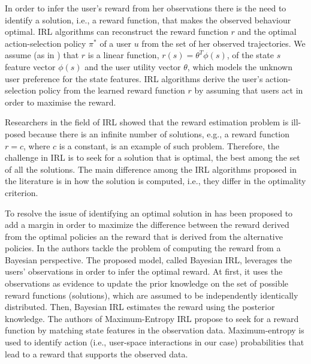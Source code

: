 In order to infer the user's reward from her observations there is the need to identify a solution, i.e., a reward function, that makes the observed behaviour optimal. 
IRL algorithms can reconstruct the reward function $r$ and the optimal action-selection policy $\pi^*$ of a user $u$ from the set of her observed trajectories. We assume (as in \cite{ng:2000}) that $r$ is a linear function, $r(s) = \theta^T\phi(s)$, of the state $s$ feature vector $\phi(s)$ 
and the user utility vector $\theta$, which models the unknown user preference for the state features. IRL algorithms derive the user's action-selection policy from the learned reward function $r$ by assuming that users act in order to maximise the reward.

Researchers in the field of IRL showed that the reward estimation problem is ill-posed because there is an infinite number of solutions, e.g., a reward function $r=c$, where $c$ is a constant, is an example of such problem.
Therefore, the challenge in IRL is to seek for a solution that is optimal, the best among the set of all the solutions. 
The main difference among the IRL algorithms proposed in the literature is in how the solution is computed, i.e., they differ in the optimality criterion.

To resolve the issue of identifying an optimal solution in \cite{ng:2000,irl:optimal_solution:2006} has been proposed to add a margin in order to maximize the difference between the reward derived from the optimal policies an the reward that is derived from the alternative policies.
%
In \cite{bayesianIRL} the authors tackle the problem of computing the reward from a Bayesian perspective. The proposed model, called Bayesian IRL, leverages the users' observations in order to infer the optimal reward. At first, it uses the observations as evidence to update the prior knowledge on the set of possible reward functions (solutions), which are assumed to be independently identically distributed. Then, Bayesian IRL estimates the reward using the posterior knowledge.
%
The authors of Maximum-Entropy IRL \cite{maxentirl} propose to seek for a reward function by matching state features in the observation data. Maximum-entropy is used to identify action (i.e., user-space interactions in our case) probabilities that lead to a reward that supports the observed data.

